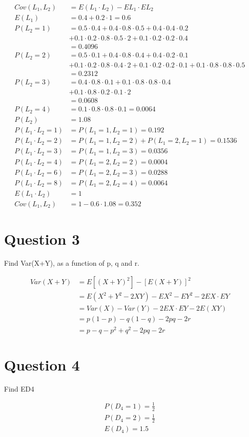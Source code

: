 \documentclass[11pt]{article}
\begin{document}
\begin{align*}
Cov(L_1, L_2) &= E(L_1 \cdot L_2) - EL_1 \cdot EL_2\\
E(L_1) &= 0.4 + 0.2 \cdot 1 = 0.6\\
P(L_2 = 1) &= 0.5 \cdot 0.4 + 0.4 \cdot 0.8 \cdot 0.5 + 0.4 \cdot 0.4 \cdot 0.2\\
		&+ 0.1 \cdot 0.2 \cdot 0.8 \cdot 0.5 \cdot 2 + 0.1 \cdot 0.2 \cdot 0.2 \cdot 0.4\\
	&= 0.4096\\ 
P(L_2 = 2) &= 0.5 \cdot 0.1 + 0.4 \cdot 0.8 \cdot 0.4 + 0.4 \cdot 0.2 \cdot 0.1\\
	& + 0.1 \cdot 0.2 \cdot 0.8 \cdot 0.4 \cdot 2 + 0.1 \cdot 0.2 \cdot 0.2 \cdot 0.1 + 0.1 \cdot 0.8 \cdot 0.8 \cdot 0.5\\
	&= 0.2312\\
P(L_2 = 3) &= 0.4 \cdot 0.8 \cdot 0.1 + 0.1 \cdot 0.8 \cdot 0.8 \cdot 0.4\\
	&+ 0.1 \cdot 0.8 \cdot 0.2 \cdot 0.1 \cdot 2\\
	&= 0.0608\\
P(L_2 = 4) &= 0.1 \cdot 0.8 \cdot 0.8 \cdot 0.1 = 0.0064\\
P(L_2) &= 1.08\\
P(L_1 \cdot L_2 = 1) &= P(L_1 = 1, L_2 = 1) = 0.192\\
P(L_1 \cdot L_2 = 2) &= P(L_1 = 1, L_2 = 2) +  P(L_1 = 2, L_2 = 1) = 0.1536\\
P(L_1 \cdot L_2 = 3) &= P(L_1 = 1, L_2 = 3) = 0.0356\\
P(L_1 \cdot L_2 = 4) &= P(L_1 = 2, L_2 = 2) = 0.0004\\
P(L_1 \cdot L_2 = 6) &= P(L_1 = 2, L_2 = 3) = 0.0288\\
P(L_1 \cdot L_2 = 8) &= P(L_1 = 2, L_2 = 4) = 0.0064\\
E(L_1 \cdot L_2) &= 1\\
Cov(L_1, L_2) &= 1- 0.6 \cdot 1.08 = 0.352
\end{align*}

\section{Question 3}

Find Var(X+Y), as a function of p, q and r.

\begin{align*}
Var(X+Y) &= E[(X+Y)^2] - [E(X+Y)]^2\\
		&= E(X^2 + Y^2 - 2XY) - EX^2 - EY^2 - 2EX \cdot EY\\
		&= Var(X) - Var(Y) - 2EX \cdot EY - 2E(XY)\\
		&=p(1-p) - q(1-q) - 2pq - 2r\\
		&=p - q - p^2 + q^2 - 2pq - 2r
\end{align*}

\section{Question 4}

Find ED4

\begin{align*}
P(D_4 = 1) = \frac12\\
P(D_4 = 2) = \frac12\\
E(D_4) = 1.5\\
\end{align*}
\end{document}
